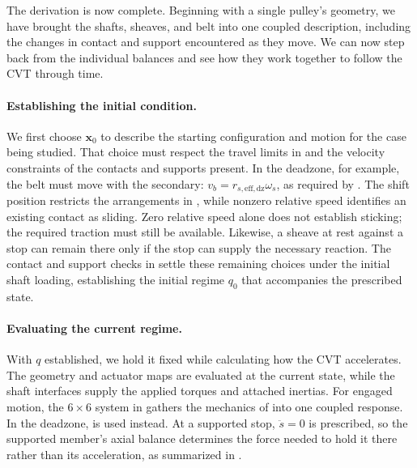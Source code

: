 \documentclass[11pt]{report}
\numberwithin{equation}{section}
\newcommand{\vect}[1]{\bm{#1}}
\begin{document}
The derivation is now complete. Beginning with a single pulley's geometry,
we have brought the shafts, sheaves, and belt into one coupled description,
including the changes in contact and support encountered as they move.
We can now step back from the individual balances and see how they work
together to follow the CVT through time.

\paragraph{Establishing the initial condition.}
We first choose \(\vect{x}_0\) to describe the starting configuration and
motion for the case being studied. That choice must respect the travel
limits in  and the velocity constraints of
the contacts and supports present. In the deadzone, for example, the belt
must move with the secondary: \(v_b=r_{s,\mathrm{eff,dz}}\omega_s\), as
required by . The shift position restricts
the arrangements in , while nonzero
relative speed identifies an existing contact as sliding. Zero relative
speed alone does not establish sticking; the required traction must still
be available. Likewise, a sheave at rest against a stop can remain there
only if the stop can supply the necessary reaction. The contact and support
checks in
settle these remaining choices under the initial shaft loading, establishing
the initial regime \(q_0\) that accompanies the prescribed state.

\paragraph{Evaluating the current regime.}
With \(q\) established, we hold it fixed while calculating how the CVT
accelerates. The geometry and actuator maps are evaluated at the current
state, while the shaft interfaces supply the applied torques and attached
inertias. For engaged motion, the \(6\times6\) system in
 gathers the mechanics of
 into one coupled
response. In the deadzone,  is used
instead. At a supported stop, \(\ddot s=0\) is prescribed, so the supported
member's axial balance determines the force needed to hold it there rather
than its acceleration, as summarized in .
\end{document}
